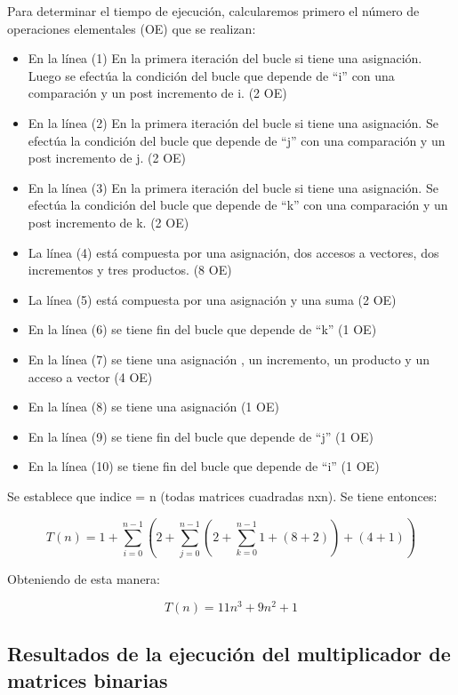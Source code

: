 	    Para determinar el tiempo de ejecución, calcularemos primero el número de operaciones elementales (OE) que se realizan: 
 		\begin{itemize}
 		  \item En la línea (1) En la primera iteración del bucle si tiene una asignación. Luego se efectúa la condición del bucle que depende de ``i'' con
 		  una comparación y un post incremento de i. (2 OE)
 		  \item En la línea (2) En la primera iteración del bucle si tiene una asignación. Se efectúa la condición del bucle que depende de ``j'' con una
 		  comparación y un post incremento de j. (2 OE)
 		  \item En la línea (3) En la primera iteración del bucle si tiene una asignación. Se efectúa la condición del bucle que depende de ``k'' con una
 		  comparación y un post incremento de k. (2 OE)
 		  \item La línea (4) está compuesta por una asignación, dos accesos a vectores, dos incrementos y tres productos. (8 OE) 
 		  \item La línea (5) está compuesta por una asignación y una suma (2 OE)
 		  \item En la línea (6) se tiene fin del bucle que depende de ``k'' (1 OE)
 		  \item En la línea (7) se tiene una asignación , un incremento, un producto y un acceso a vector (4 OE)
 		  \item En la línea (8) se tiene una asignación (1 OE)
 		  \item En la línea (9) se tiene fin del bucle que depende de ``j'' (1 OE)
 		  \item En la línea (10) se tiene fin del bucle que depende de ``i'' (1 OE)
 		\end{itemize}
		
		Se establece que indice = n (todas matrices cuadradas nxn). Se tiene entonces: 
		
		\begin{equation*}
		T(n) = 1 + \sum_{i=0}^{n-1} \left (2 + \sum_{j=0}^{n-1} \left (2 + \sum_{k=0}^{n-1} 1 + (8+2)\right ) + (4 + 1) \right )      
		\end{equation*}
		
		Obteniendo de esta manera:
		
		\begin{equation*}
		T(n) = 11 n^3 + 9 n^2 + 1       
		\end{equation*}
		 
		
		\subsection{Resultados de la ejecución del multiplicador de matrices binarias}
			
